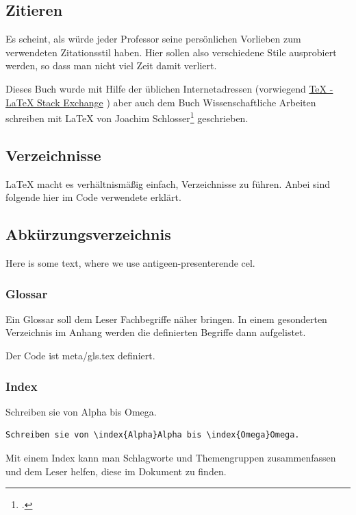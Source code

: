 \subsection{Zitieren}
Es scheint, als würde jeder Professor seine persönlichen Vorlieben zum verwendeten Zitationsstil haben. Hier sollen also verschiedene Stile ausprobiert werden, so dass man nicht viel Zeit damit verliert.

Dieses Buch wurde mit Hilfe der üblichen Internetadressen (vorwiegend \href{https://tex.stackexchange.com/}{TeX - LaTeX Stack Exchange} ) aber auch dem Buch \glqq Wissenschaftliche Arbeiten schreiben mit LaTeX\grqq{} von Joachim Schlosser\footcite{schlosserWissenschaftlicheArbeitenSchreiben2014} geschrieben.
\subsection{Verzeichnisse}
\LaTeX{} macht es verhältnismäßig einfach, Verzeichnisse zu führen. Anbei sind folgende hier im Code verwendete erklärt.
\subsection{Abkürzungsverzeichnis}
Here is some text, where we use antigeen-presenterende cel.
\subsubsection{Glossar}
Ein Glossar soll dem Leser Fachbegriffe näher bringen. In einem gesonderten Verzeichnis im Anhang werden die definierten Begriffe dann aufgelistet.

Der Code ist meta/gls.tex definiert.
\subsubsection{Index}
Schreiben sie von Alpha bis Omega.
\begin{lstlisting}
Schreiben sie von \index{Alpha}Alpha bis \index{Omega}Omega.
\end{lstlisting}

Mit einem Index kann man Schlagworte und Themengruppen zusammenfassen und dem Leser helfen, diese im Dokument zu finden.
